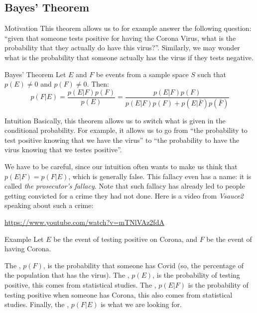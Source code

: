 \documentclass[a4paper]{article}
\begin{document}
\subsection{Bayes' Theorem}
\begin{parag}{Motivation}
    This theorem allows us to for example answer the following question: ``given that someone tests positive for having the Corona Virus, what is the probability that they actually do have this virus?''. Similarly, we may wonder what is the probability that someone actually has the virus if they tests negative.
\end{parag}

\begin{parag}{Bayes' Theorem}
    Let $E$ and $F$ be events from a sample space $S$ such that $p\left(E\right) \neq 0$ and $p\left(F\right) \neq 0$. Then: 
    \[p\left(F|E\right) = \frac{p\left(E|F\right)p\left(F\right)}{p\left(E\right)} = \frac{p\left(E|F\right)p\left(F\right)}{p\left(E|F\right)p\left(F\right) + p\left(E | \bar{F}\right)p\left(\bar{F}\right)}\]
    
    \begin{subparag}{Intuition}
        Basically, this theorem allows us to switch what is given in the conditional probability. For example, it allows us to go from ``the probability to test positive knowing that we have the virus'' to ``the probability to have the virus knowing that we testes positive''.

        We have to be careful, since our intuition often wants to make us think that $p\left(E|F\right) = p\left(F|E\right)$, which is generally false. This fallacy even has a name: it is called \textit{the prosecutor's fallacy}. Note that such fallacy has already led to people getting convicted for a crime they had not done. Here is a video from \textit{Vsauce2} speaking about such a crime:
        \begin{center}
            \url{https://www.youtube.com/watch?v=mTNlVAz2fdA}
        \end{center}
        
    \end{subparag}

    \begin{subparag}{Example}
        Let $E$ be the event of testing positive on Corona, and $F$ be the event of having Corona. 

        The , $p\left(F\right)$, is the probability that someone has Covid (so, the percentage of the population that has the virus). The , $p\left(E\right)$, is the probability of testing positive, this comes from statistical studies. The , $p\left(E|F\right)$ is the probability of testing positive when someone has Corona, this also comes from statistical studies. Finally, the , $p\left(F|E\right)$ is what we are looking for.
    \end{subparag}


\end{parag}
\end{document}
